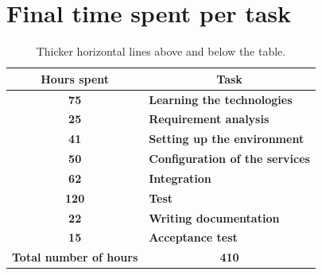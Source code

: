 \section{Final time spent per task}
	\begin{table}[H]
		\begin{tabularx}{\textwidth}{c|X}
			\centering\textbf{Hours spent} & \multicolumn{1}{c}{\textbf{Task}}\\\hline
			\textbf{75}&\textbf{Learning the technologies}\\\hline
			\textbf{25}&\textbf{Requirement analysis}\\\hline
			\textbf{41}&\textbf{Setting up the environment}\\\hline
			\textbf{50}&\textbf{Configuration of the services}\\\hline
			\textbf{62}&\textbf{Integration}\\\hline
			\textbf{120}&\textbf{Test}\\\hline
			\textbf{22}&\textbf{Writing documentation}\\\hline
			\textbf{15}&\textbf{Acceptance test}\\\hline
			\textbf{Total number of hours}&\multicolumn{1}{c}{\textbf{410}} \\	
		\end{tabularx}
		\caption{Thicker horizontal lines above and below the table.}
	\end{table}


